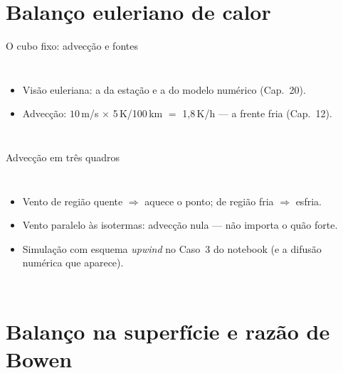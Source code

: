 \documentclass[aspectratio=169,11pt]{beamer}
\begin{document}
\section{Balanço euleriano de calor}

\begin{frame}{O cubo fixo: advecção e fontes}
  \begin{columns}
    \vspace{0.4em}
    \begin{itemize}
      \item Visão euleriana: a da estação e a do modelo numérico
            (Cap.~20).
      \item Advecção: $10$\,m/s $\times$ 5\,K/100\,km $=$
            \alert{1{,}8\,K/h} — a frente fria (Cap.~12).
    \end{itemize}
  \end{columns}
\end{frame}

\begin{frame}{Advecção em três quadros}
  \begin{columns}
    \begin{itemize}
      \item Vento de região quente $\Rightarrow$ aquece o ponto;
            de região fria $\Rightarrow$ esfria.
      \item Vento paralelo às isotermas: advecção \alert{nula} — não
            importa o quão forte.
      \item Simulação com esquema \emph{upwind} no Caso~3 do notebook
            (e a difusão numérica que aparece).
    \end{itemize}
  \end{columns}
\end{frame}

\section{Balanço na superfície e razão de Bowen}
\end{document}
